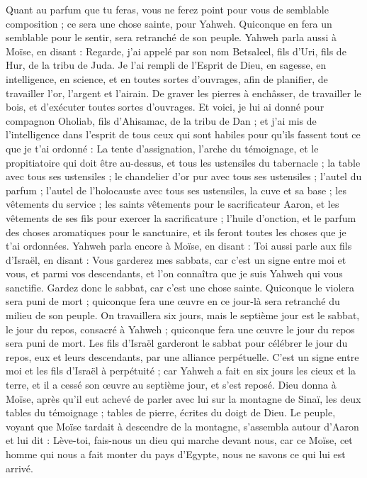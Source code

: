 \begin{multicols}{2}
Quant au parfum que tu feras, vous ne ferez point pour vous de semblable composition ; ce sera une chose sainte, pour Yahweh.
Quiconque en fera un semblable pour le sentir, sera retranché de son peuple.
\VerseOne{}Yahweh parla aussi à Moïse, en disant :
Regarde, j'ai appelé par son nom Betsaleel, fils d'Uri, fils de Hur, de la tribu de Juda.
Je l'ai rempli de l'Esprit de Dieu, en sagesse, en intelligence, en science, et en toutes sortes d'ouvrages,
afin de planifier, de travailler l’or, l’argent et l’airain.
De graver les pierres à enchâsser, de travailler le bois, et d’exécuter toutes sortes d’ouvrages.
Et voici, je lui ai donné pour compagnon Oholiab, fils d'Ahisamac, de la tribu de Dan ; et j'ai mis de l’intelligence dans l’esprit de tous ceux qui sont habiles pour qu'ils fassent tout ce que je t’ai ordonné :
La tente d'assignation, l'arche du témoignage, et le propitiatoire qui doit être au-dessus, et tous les ustensiles du tabernacle ;
la table avec tous ses ustensiles ; le chandelier d’or pur avec tous ses ustensiles ; l'autel du parfum ;
l'autel de l'holocauste avec tous ses ustensiles, la cuve et sa base ;
les vêtements du service ; les saints vêtements pour le sacrificateur Aaron, et les vêtements de ses fils pour exercer la sacrificature ;
l'huile d'onction, et le parfum des choses aromatiques pour le sanctuaire, et ils feront toutes les choses que je t'ai ordonnées.
Yahweh parla encore à Moïse, en disant :
Toi aussi parle aux fils d'Israël, en disant : Vous garderez mes sabbats, car c'est un signe entre moi et vous, et parmi vos descendants, et l’on connaîtra que je suis Yahweh qui vous sanctifie.
Gardez donc le sabbat, car c’est une chose sainte. Quiconque le violera sera puni de mort ; quiconque fera une œuvre en ce jour-là sera retranché du milieu de son peuple.
On travaillera six jours, mais le septième jour est le sabbat, le jour du repos, consacré à Yahweh ; quiconque fera une œuvre le jour du repos sera puni de mort.
Les fils d'Israël garderont le sabbat pour célébrer le jour du repos, eux et leurs descendants, par une alliance perpétuelle.
C'est un signe entre moi et les fils d'Israël à perpétuité ; car Yahweh a fait en six jours les cieux et la terre, et il a cessé son œuvre au septième jour, et s'est reposé\FTNT{}.
Dieu donna à Moïse, après qu'il eut achevé de parler avec lui sur la montagne de Sinaï, les deux tables du témoignage ; tables de pierre, écrites du doigt de Dieu\FTNT{}.
\VerseOne{}Le peuple, voyant que Moïse tardait à descendre de la montagne, s'assembla autour d’Aaron et lui dit : Lève-toi, fais-nous un dieu qui marche devant nous, car ce Moïse, cet homme qui nous a fait monter du pays d'Egypte, nous ne savons ce qui lui est arrivé\FTNT{}.

\end{multicols}

